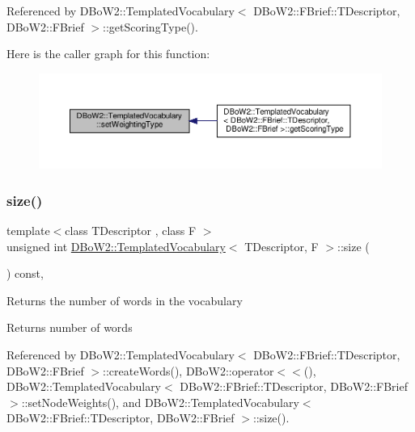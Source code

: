 Referenced by D\+Bo\+W2\+::\+Templated\+Vocabulary$<$ D\+Bo\+W2\+::\+F\+Brief\+::\+T\+Descriptor, D\+Bo\+W2\+::\+F\+Brief $>$\+::get\+Scoring\+Type().

Here is the caller graph for this function\+:\nopagebreak
\begin{figure}[H]
\begin{center}
\leavevmode
\includegraphics[width=350pt]{classDBoW2_1_1TemplatedVocabulary_aa8f63a3379debd40214899d996cfc733_icgraph}
\end{center}
\end{figure}
\mbox{\label{classDBoW2_1_1TemplatedVocabulary_a8baad280d6daf74ee43d7cd911363137}} 
\subsubsection{\texorpdfstring{size()}{size()}}
{\footnotesize\ttfamily template$<$class T\+Descriptor , class F $>$ \\
unsigned int \hyperlink{classDBoW2_1_1TemplatedVocabulary}{D\+Bo\+W2\+::\+Templated\+Vocabulary}$<$ T\+Descriptor, F $>$\+::size (\begin{DoxyParamCaption}{ }\end{DoxyParamCaption}) const\hspace{0.3cm}{\ttfamily [inline]}, {\ttfamily [virtual]}}

Returns the number of words in the vocabulary \begin{DoxyReturn}{Returns}
number of words 
\end{DoxyReturn}


Referenced by D\+Bo\+W2\+::\+Templated\+Vocabulary$<$ D\+Bo\+W2\+::\+F\+Brief\+::\+T\+Descriptor, D\+Bo\+W2\+::\+F\+Brief $>$\+::create\+Words(), D\+Bo\+W2\+::operator$<$$<$(), D\+Bo\+W2\+::\+Templated\+Vocabulary$<$ D\+Bo\+W2\+::\+F\+Brief\+::\+T\+Descriptor, D\+Bo\+W2\+::\+F\+Brief $>$\+::set\+Node\+Weights(), and D\+Bo\+W2\+::\+Templated\+Vocabulary$<$ D\+Bo\+W2\+::\+F\+Brief\+::\+T\+Descriptor, D\+Bo\+W2\+::\+F\+Brief $>$\+::size().

